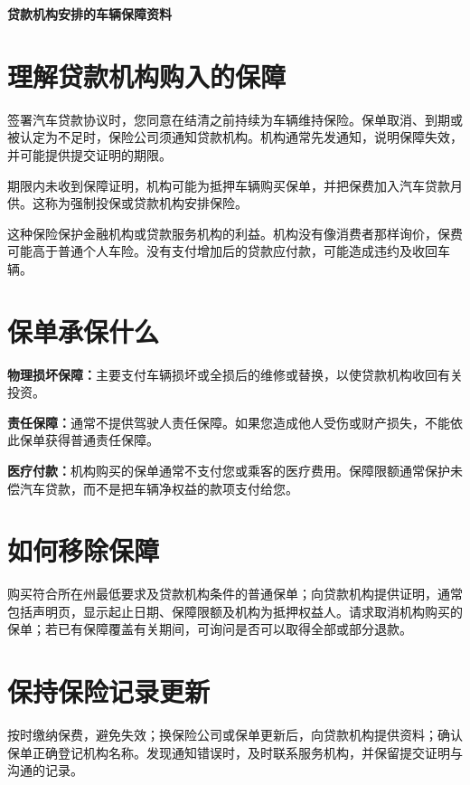 \documentclass[UTF8,fontset=none,11pt,a4paper]{ctexart}
\begin{document}
{\noindent\fontsize{20}{25}\selectfont\bfseries 贷款机构安排的车辆保障资料\par}
\vspace{10pt}
\section*{理解贷款机构购入的保障}
签署汽车贷款协议时，您同意在结清之前持续为车辆维持保险。保单取消、到期或被认定为不足时，保险公司须通知贷款机构。机构通常先发通知，说明保障失效，并可能提供提交证\allowbreak\mbox{明的期限。}


期限内未收到保障证明，机构可能为抵押车辆购买保单，并把保费加入汽车贷款月供。这称为强制投保或贷款机构\allowbreak\mbox{安排保险。}


这种保险保护金融机构或贷款服务机构的利益。机构没有像消费者那样询价，保费可能高于普通个人车险。没有支付增加后的贷款应付款，可能造成违约及\allowbreak\mbox{收回车辆。}


\section*{保单承保什么}
\textbf{物理损坏保障：}主要支付车辆损坏或全损后的维修或替换，以使贷款机构收回\allowbreak\mbox{有关投资。}


\textbf{责任保障：}通常不提供驾驶人责任保障。如果您造成他人受伤或财产损失，不能依此保单获得普通\allowbreak\mbox{责任保障。}


\textbf{医疗付款：}机构购买的保单通常不支付您或乘客的医疗费用。保障限额通常保护未偿汽车贷款，而不是把车辆净权益的款项\allowbreak\mbox{支付给您。}


\section*{如何移除保障}
购买符合所在州最低要求及贷款机构条件的普通保单；向贷款机构提供证明，通常包括声明页，显示起止日期、保障限额及机构为抵押权益人。请求取消机构购买的保单；若已有保障覆盖有关期间，可询问是否可以取得全部或\allowbreak\mbox{部分退款。}


\section*{保持保险记录更新}
按时缴纳保费，避免失效；换保险公司或保单更新后，向贷款机构提供资料；确认保单正确登记机构名称。发现通知错误时，及时联系服务机构，并保留提交证明与沟\allowbreak\mbox{通的记录。}
\end{document}
